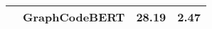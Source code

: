 \begin{table}[htb!]
{\begin{tabular}{|c|c|c|c|}
    & GraphCodeBERT&28.19 &2.47 \\\hline 



  
  
\end{tabular}}
\end{table}




